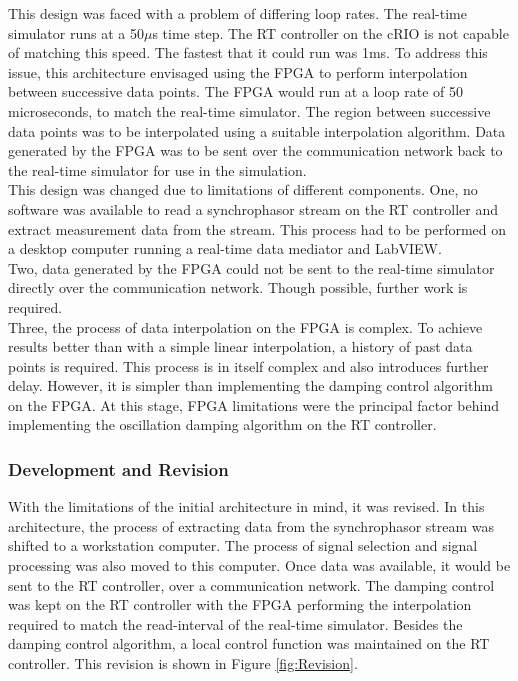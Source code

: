 \documentclass[conference]{IEEEtran}
\begin{document}
This design was faced with a problem of differing loop rates. The real-time simulator runs at a 50$\mu$s time step. The RT controller on the cRIO is not capable of matching this speed. The fastest that it could run was 1ms. To address this issue, this architecture envisaged using the FPGA to perform interpolation between successive data points. The FPGA would run at a loop rate of 50 microseconds, to match the real-time simulator. The region between successive data points was to be interpolated using a suitable interpolation algorithm. Data generated by the FPGA was to be sent over the communication network back to the real-time simulator for use in the simulation.\\

This design was changed due to limitations of different components. One, no software was available to read a synchrophasor stream on the RT controller and extract measurement data from the stream. This process had to be performed on a desktop computer running a real-time data mediator and LabVIEW.\\

Two, data generated by the FPGA could not be sent to the real-time simulator directly over the communication network. Though possible, further work is required.\\

Three, the process of data interpolation on the FPGA is complex. To achieve results better than with a simple linear interpolation, a history of past data points is required. This process is in itself complex and also introduces further delay. However, it is simpler than implementing the damping control algorithm on the FPGA. At this stage, FPGA limitations were the principal factor behind implementing the oscillation damping algorithm on the RT  controller.\\

\subsubsection{Development and Revision}


With the limitations of the initial architecture in mind, it was revised. In this architecture, the process of  extracting data from the synchrophasor stream was shifted to a workstation computer. The process of signal selection and signal processing was also moved to this computer. Once data was available, it would be sent to the RT controller, over a communication network. The damping control was kept on the RT  controller with the FPGA performing the interpolation required to match the read-interval of the real-time simulator. Besides the damping control algorithm, a local control function was maintained on the RT controller. This revision is shown in Figure \ref{fig:Revision}.\\
\end{document}
